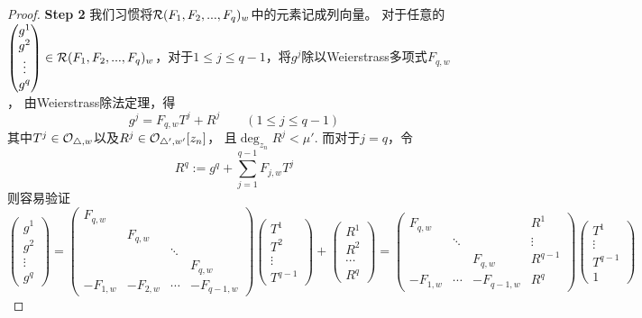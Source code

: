 \begin{proof}
\textbf{Step 2}
我们习惯将$\mathcal{R}(F_1,F_2,...,F_q)_w$中的元素记成列向量。
对于任意的
$
  \begin{pmatrix}
    g^1 \\
    g^2 \\
    \vdots \\
    g^q
  \end{pmatrix}
\in
  \mathcal{R}(F_1,F_2,...,F_q)_w
$，对于$1\leq j\leq q-1$，将$g^j$除以Weierstrass多项式$F_{q,w}$，
由Weierstrass除法定理，得
$$
  g^j=F_{q,w}T^j+R^j
\qquad
  (1\leq j\leq q-1)
$$
其中$T^j\in\mathcal{O}_{\triangle ,w}$以及$R^j\in\mathcal{O}_{\triangle',w'}[z_n]$，
且$\deg_{z_n}R^j<\mu'$.
而对于$j=q$，令
$$
  R^q
:=
  g^q+\sum_{j=1}^{q-1}F_{j,w}T^j
$$
则容易验证
$$
  \begin{pmatrix}
    g^1 \\
    g^2 \\
    \vdots \\
    g^q
  \end{pmatrix}
=
  \begin{pmatrix}
    F_{q,w} &   &   &   \\
      & F_{q,w} &   &   \\
      &   & \ddots  &   \\
      &   &   & F_{q,w} \\
    -F_{1,w} & -F_{2,w} & \cdots & -F_{q-1,w}
  \end{pmatrix}
  \begin{pmatrix}
    T^1 \\
    T^2 \\
    \vdots \\
    T^{q-1}
  \end{pmatrix}
+
  \begin{pmatrix}
    R^1 \\
    R^2 \\
    \cdots \\
    R^q
  \end{pmatrix}
=
  \begin{pmatrix}
    F_{q,w} &  &  & R^1 \\
      & \ddots &   & \vdots \\
      &   & F_{q,w} & R^{q-1} \\
    -F_{1,w} & \cdots & -F_{q-1,w} & R^q
  \end{pmatrix}
  \begin{pmatrix}
    T^1 \\
    \vdots \\
    T^{q-1} \\
    1
  \end{pmatrix}
$$


\end{proof}
